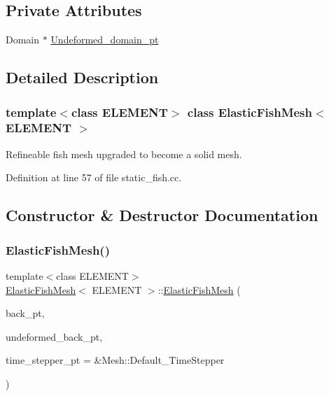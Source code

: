 \subsection*{Private Attributes}
\begin{DoxyCompactItemize}
\item 
Domain $\ast$ \hyperlink{classElasticFishMesh_aef83429a56e87c7218275c1da6c57087}{Undeformed\+\_\+domain\+\_\+pt}
\end{DoxyCompactItemize}


\subsection{Detailed Description}
\subsubsection*{template$<$class E\+L\+E\+M\+E\+NT$>$\newline
class Elastic\+Fish\+Mesh$<$ E\+L\+E\+M\+E\+N\+T $>$}

Refineable fish mesh upgraded to become a solid mesh. 

Definition at line 57 of file static\+\_\+fish.\+cc.



\subsection{Constructor \& Destructor Documentation}
\mbox{\label{classElasticFishMesh_a76c4d63d48b9ee48c3742e55057cfba0}} 
\subsubsection{\texorpdfstring{Elastic\+Fish\+Mesh()}{ElasticFishMesh()}}
{\footnotesize\ttfamily template$<$class E\+L\+E\+M\+E\+NT$>$ \\
\hyperlink{classElasticFishMesh}{Elastic\+Fish\+Mesh}$<$ E\+L\+E\+M\+E\+NT $>$\+::\hyperlink{classElasticFishMesh}{Elastic\+Fish\+Mesh} (\begin{DoxyParamCaption}\item[{Geom\+Object $\ast$}]{back\+\_\+pt,  }\item[{Geom\+Object $\ast$}]{undeformed\+\_\+back\+\_\+pt,  }\item[{Time\+Stepper $\ast$}]{time\+\_\+stepper\+\_\+pt = {\ttfamily \&Mesh\+:\+:Default\+\_\+TimeStepper} }\end{DoxyParamCaption})\hspace{0.3cm}{\ttfamily [inline]}}



